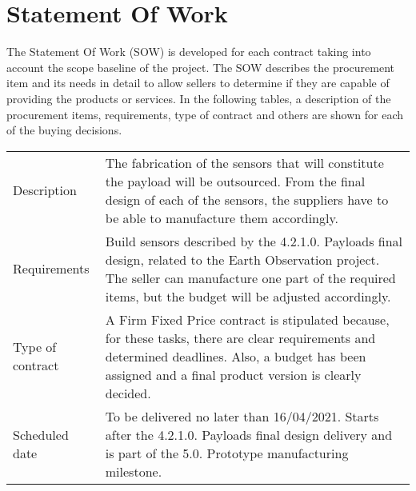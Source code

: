 \section{Statement Of Work}
The Statement Of Work (SOW) is developed for each contract taking into account the scope baseline of the project. The SOW describes the procurement item and its needs in detail to allow sellers to determine if they are capable of providing the products or services.
In the following tables, a description of the procurement items, requirements, type of contract and others are shown for each of the buying decisions.
\begin{table}[H]
	\centering
	\begin{tabular}{>{\raggedright\arraybackslash}p{3cm} >{\arraybackslash}p{11cm}}
		
		\toprule[2pt]
		
		\multicolumn{2}{c}{\textbf{SOW - 5.1.1. Manufacturing of payload sensors}}\\
		
		\midrule[1.5pt]
		
		Description & The fabrication of the sensors that will constitute the payload will be outsourced. From the final design of each of the sensors, the suppliers have to be able to manufacture them accordingly.\vspace{0.2cm} \\
		
		\midrule
		
		Requirements & Build sensors described by the 4.2.1.0. Payloads final design, related to the Earth Observation project. The seller can manufacture one part of the required items, but the budget will be adjusted accordingly.\vspace{0.2cm} \\
		
		\midrule
		
		Type of contract & A Firm Fixed Price contract is stipulated because, for these tasks, there are clear requirements and determined deadlines. Also, a budget has been assigned and a final product version is clearly decided.\vspace{0.2cm} \\
		
		\midrule
		
		Scheduled date & To be delivered no later than 16/04/2021. Starts after the 4.2.1.0. Payloads final design delivery and is part of the 5.0. Prototype manufacturing milestone.\vspace{0.2cm} \\
		

\end{tabular}
\end{table}
